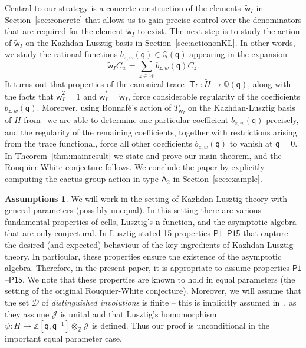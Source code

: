 \documentclass[11pt]{article}
\theoremstyle{plain}
\theoremstyle{definition}
\newtheorem{assumptions}[thm]{Assumptions}
\numberwithin{equation}{section}
\def\tw{\widetilde{\mathsf{w}}_I}
\def\sA{\mathsf{A}}
\def\cD{\mathcal{D}}
\def\cJ{\mathcal{J}}
\def\QQ{\mathbb{Q}}
\def\ZZ{\mathbb{Z}}
\DeclareMathOperator\Tr{\mathsf{Tr}}
\newcommand{\sw}{\mathsf{w}}
\newcommand{\ba}{\mathbf{a}}
\newcommand{\sq}{\mathsf{q}}
\begin{document}
Central to our strategy is a concrete construction of the elements~$\tw$ in Section~\ref{sec:concrete} that allows us to gain precise control over the denominators that are required for the element $\tw$ to exist. The next step is to study the action of $\tw$ on the Kazhdan-Lusztig basis in Section~\ref{sec:actiononKL}. In other words, we study the rational functions $b_{z,w}(\sq)\in\QQ(\sq)$ appearing in the expansion 
$$
\tw C_w=\sum_{z\in W}b_{z,w}(\sq)C_z. 
$$
It turns out that properties of the canonical trace $\Tr:\tilde{H}\to \QQ(\sq)$, along with the facts that $\tw^2=1$ and $\tw^*=\tw$, force considerable regularity of the coefficients $b_{z,w}(\sq)$. Moreover, using Bonnaf\'e's action of $T_{\sw_I}$ on the Kazhdan-Lusztig basis of $H$ from~\cite{Bon:16} we are able to determine one particular coefficient $b_{z,w}(\sq)$ precisely, and the regularity of the remaining coefficients, together with restrictions arising from the trace functional, force all other coefficients $b_{z,w}(\sq)$ to vanish at $\sq=0$. In Theorem~\ref{thm:mainresult} we state and prove our main theorem, and the Rouquier-White conjecture follows. We conclude the paper by explicitly computing the cactus group action in type $\tilde{\sA}_2$ in Section~\ref{sec:example}.





\begin{assumptions}\label{ass:1}
We will work in the setting of Kazhdan-Lusztig theory with general parameters (possibly unequal). In this setting there are various fundamental properties of cells, Lusztig's $\ba$-function, and the asymptotic algebra that are only conjectural. In \cite{Lus:03} Lusztig stated 15 properties $\mathsf{P1}$--$\mathsf{P15}$ that capture the desired (and expected) behaviour of the key ingredients of Kazhdan-Lusztig theory. In particular, these properties ensure the existence of the asymptotic algebra. Therefore, in the present paper, it is appropriate to assume properties $\mathsf{P1}$--$\mathsf{P15}$. We note that these properties are known to hold in equal parameters (the setting of the original Rouquier-White conjecture). Moreover, we will assume that the set $\cD$ of \textit{distinguished involutions} is finite -- this is implicitly assumed in~\cite{RW:24}, as they assume $\cJ$ is unital and that Lusztig's homomorphism $\psi:H\to \ZZ[\sq,\sq^{-1}]\otimes_{\ZZ}\cJ$ is defined. Thus our proof is unconditional in the important equal parameter case. 
\end{assumptions}
\end{document}
